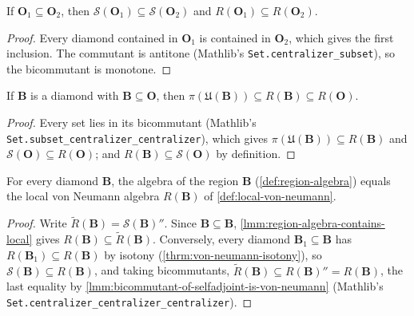 \begin{lemma}
    \label{lmm:region-algebra-mono}
    \leanok
    If $\mathbf{O}_1 \subseteq \mathbf{O}_2$, then $\mathcal{S}(\mathbf{O}_1) \subseteq \mathcal{S}(\mathbf{O}_2)$ and $R(\mathbf{O}_1) \subseteq R(\mathbf{O}_2)$.
\end{lemma}
\begin{proof}
    \leanok
    Every diamond contained in $\mathbf{O}_1$ is contained in $\mathbf{O}_2$, which gives the first inclusion. The commutant is antitone (Mathlib's \texttt{Set.centralizer\_subset}), so the bicommutant is monotone.
\end{proof}

\begin{lemma}
    \label{lmm:region-algebra-contains-local}
    \leanok
    If $\mathbf{B}$ is a diamond with $\mathbf{B} \subseteq \mathbf{O}$, then $\pi(\mathfrak{U}(\mathbf{B})) \subseteq R(\mathbf{B}) \subseteq R(\mathbf{O})$.
\end{lemma}
\begin{proof}
    \leanok
    Every set lies in its bicommutant (Mathlib's \texttt{Set.subset\_centralizer\_centralizer}), which gives $\pi(\mathfrak{U}(\mathbf{B})) \subseteq R(\mathbf{B})$ and $\mathcal{S}(\mathbf{O}) \subseteq R(\mathbf{O})$; and $R(\mathbf{B}) \subseteq \mathcal{S}(\mathbf{O})$ by definition.
\end{proof}

\begin{lemma}
    \label{lmm:region-algebra-diamond}
    \leanok
    For every diamond $\mathbf{B}$, the algebra of the region $\mathbf{B}$ (\ref{def:region-algebra}) equals the local von Neumann algebra $R(\mathbf{B})$ of \ref{def:local-von-neumann}.
\end{lemma}
\begin{proof}
    \leanok
    Write $\widetilde{R}(\mathbf{B}) = \mathcal{S}(\mathbf{B})''$. Since $\mathbf{B} \subseteq \mathbf{B}$, \ref{lmm:region-algebra-contains-local} gives $R(\mathbf{B}) \subseteq \widetilde{R}(\mathbf{B})$. Conversely, every diamond $\mathbf{B}_1 \subseteq \mathbf{B}$ has $R(\mathbf{B}_1) \subseteq R(\mathbf{B})$ by isotony (\ref{thrm:von-neumann-isotony}), so $\mathcal{S}(\mathbf{B}) \subseteq R(\mathbf{B})$, and taking bicommutants, $\widetilde{R}(\mathbf{B}) \subseteq R(\mathbf{B})'' = R(\mathbf{B})$, the last equality by \ref{lmm:bicommutant-of-selfadjoint-is-von-neumann} (Mathlib's \texttt{Set.centralizer\_centralizer\_centralizer}).
\end{proof}

